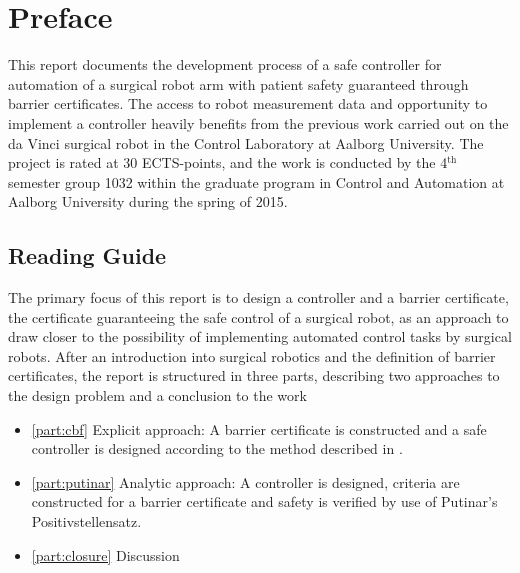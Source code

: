 \chapter*{Preface}
\vspace*{-2mm}
This report documents the development process of a safe controller for automation of a surgical robot arm with patient safety guaranteed through barrier certificates. %
The access to robot measurement data and opportunity to implement a controller heavily benefits from the previous work carried out on the da Vinci surgical robot in the Control Laboratory at Aalborg University.
The project is rated at 30 ECTS-points, and the work is conducted by the 4$^\text{th}$ semester group 1032 within the graduate program in Control and Automation at Aalborg University during the spring of 2015.



\vspace*{-2mm}
\section*{Reading Guide}
\vspace*{-2mm}
The primary focus of this report is to design a controller and a barrier certificate, the certificate guaranteeing the safe control of a surgical robot, as an approach to draw closer to the possibility of implementing automated control tasks by surgical robots. 
After an introduction into surgical robotics and the definition of barrier certificates, the report is structured in three parts, describing two approaches to the design problem and a conclusion to the work
\vspace*{-3mm}
\begin{itemize}
\itemsep-1.4mm
\item \autoref{part:cbf} Explicit approach: A barrier certificate is constructed and a safe controller is designed according to the method described in \citep{bib:org_control}.
\item \autoref{part:putinar} Analytic approach: A controller is designed, criteria are constructed for a barrier certificate and  safety is verified by use of Putinar's Positivstellensatz.
\item \autoref{part:closure} Discussion 
\end{itemize}
\vspace*{-2mm}

